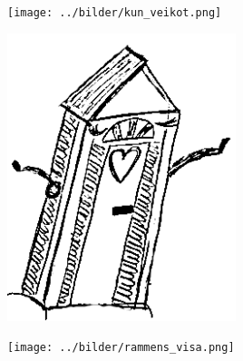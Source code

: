 %



\sclearpage

\sclearpage

\begin{intersong}
	\begin{center}
		\vspace{20mm}
		\texttt{[image: ../bilder/kun\_veikot.png]} 
	\end{center}
\end{intersong}
\sclearpage

\begin{intersong}
	\begin{center}
		\includegraphics[width=0.5\textwidth]{../bilder/fardigabilder/CamillasFardigaBilder/Nylandsnationshus3.png} 
	\end{center}
\end{intersong}
\sclearpage

\begin{intersong}
	\begin{center}
		\texttt{[image: ../bilder/rammens\_visa.png]} 
	\end{center}
\end{intersong}

\sclearpage

\sclearpage



\sclearpage

